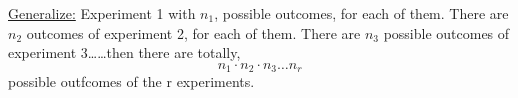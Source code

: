 \documentclass[11pt, letterpaper]{article}
\begin{document}
\noindent\underline{Generalize:} \newline
Experiment 1 with $n_1$, possible outcomes, for each of them. There are $n_2$ outcomes of experiment 2, for each of them. There are $n_3$ possible outcomes of experiment 3\dots\dots then there are totally, \newline
\begin{equation*}
  n_1 \cdot n_2 \cdot n_3 \dots n_r
\end{equation*}
possible outfcomes of the r experiments.
\end{document}
